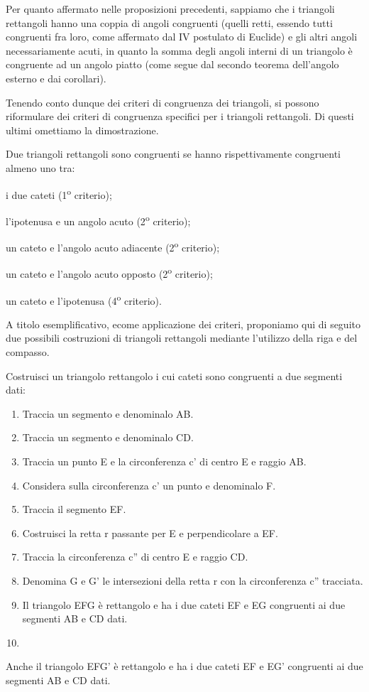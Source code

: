 Per quanto affermato nelle proposizioni precedenti, sappiamo che i 
triangoli rettangoli hanno una coppia di angoli congruenti (quelli 
retti, essendo tutti congruenti fra loro, come affermato dal IV 
postulato di Euclide) e gli altri angoli necessariamente acuti, in 
quanto la somma degli angoli interni di un triangolo è congruente ad 
un angolo piatto (come segue dal secondo teorema dell'angolo esterno 
e dai corollari).

Tenendo conto dunque dei criteri di congruenza dei triangoli, si 
possono riformulare dei criteri di congruenza specifici per i 
triangoli rettangoli. Di questi ultimi omettiamo la dimostrazione. 

\begin{teorema}
	Due triangoli rettangoli sono congruenti se hanno rispettivamente 
	congruenti almeno uno tra:
	\begin{itemize*}
		\item i due cateti (1\textsuperscript{o} criterio);
		\item l'ipotenusa e un angolo acuto (2\textsuperscript{o} criterio);
		\item un cateto e l'angolo acuto adiacente (2\textsuperscript{o} 
		criterio);
		\item un cateto e l'angolo acuto opposto (2\textsuperscript{o} 
		criterio);
		\item un cateto e l'ipotenusa (4\textsuperscript{o} criterio).
	\end{itemize*}
\end{teorema}

A titolo esemplificativo, ecome applicazione dei criteri, proponiamo qui di seguito  due possibili costruzioni di triangoli rettangoli mediante l'utilizzo della riga e del compasso.

\begin{procedura}
	Costruisci un triangolo rettangolo i cui cateti sono congruenti a due segmenti dati:
	\begin{enumerate} [nosep]
		\item 
		Traccia un segmento e denominalo AB.
		\item 
		Traccia un segmento e denominalo CD.
		\item 
		Traccia un punto E e la circonferenza c' di centro E e raggio AB.
		\item 
		Considera sulla circonferenza c' un punto e denominalo F.
		\item 
		Traccia il segmento EF.
		\item 
		Costruisci la retta r passante per E e perpendicolare a EF.
		\item 
		Traccia la circonferenza c'' di centro E e raggio CD.
		\item 
		Denomina G e G' le intersezioni della retta r con la circonferenza c'' tracciata.
		\item 
		Il triangolo EFG è rettangolo e ha i due cateti EF e EG congruenti ai due segmenti AB e CD dati. 
		\item 
	\end{enumerate}
	Anche il triangolo EFG' è rettangolo e ha i due cateti EF e EG' congruenti ai due segmenti AB e CD dati. \end{procedura}

